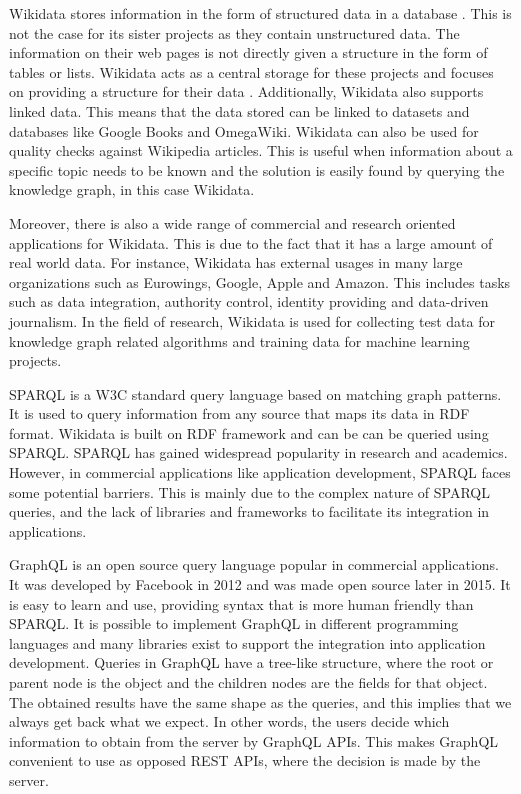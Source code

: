 Wikidata stores information in the form of structured data in a database \cite{Tharani2021}. This is not the case for its sister projects as they contain unstructured data. The information on their web pages is not directly given a structure in the form of tables or lists. Wikidata acts as a central storage for these projects and focuses on providing a structure for their data \cite{Wikidata2014}. Additionally, Wikidata also supports linked data. This means that the data stored can be linked to datasets and databases like Google Books and OmegaWiki. Wikidata can also be used for quality checks against Wikipedia articles. This is useful when information about a specific topic needs to be known and the solution is easily found by querying the knowledge graph, in this case Wikidata.

Moreover, there is also a wide range of commercial and research oriented applications for Wikidata. This is due to the fact that it has a large amount of real world data. For instance, Wikidata has external usages in many large organizations such as Eurowings, Google, Apple and Amazon. This includes tasks such as data integration, authority control, identity providing and data-driven journalism. In the field of research, Wikidata is used for collecting test data for knowledge graph related algorithms and training data for machine learning projects.

SPARQL \cite{C.B.Aranda2013} is a W3C standard query language based on matching graph patterns. It is used to query information from any source that maps its data in RDF format. Wikidata is built on RDF framework and can be can be queried using SPARQL. SPARQL has gained widespread popularity in research and academics. However, in commercial applications like application development, SPARQL faces some potential barriers. This is mainly due to the complex nature of SPARQL queries, and the lack of libraries and frameworks to facilitate its integration in applications. 

GraphQL \cite{GraphQLa} is an open source query language popular in commercial applications. It was developed by Facebook in 2012 and was made open source later in 2015. It is easy to learn and use, providing syntax that is more human friendly than SPARQL. It is possible to implement GraphQL in different programming languages and many libraries exist to support the integration into application development. Queries in GraphQL have a tree-like structure, where the root or parent node is the object and the children nodes are the fields for that object. The obtained results have the same shape as the queries, and this implies that we always get back what we expect. In other words, the users decide which information to obtain from the server by GraphQL APIs. This makes GraphQL convenient to use as opposed REST APIs, where the decision is made by the server. 

